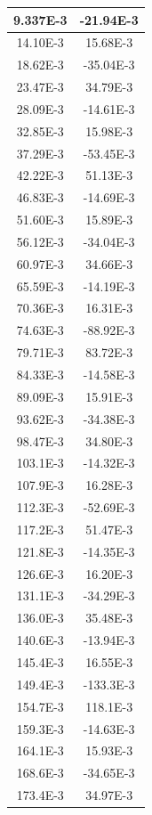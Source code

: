 \documentclass[english, 12pt, a4paper]{ifimaster}
\begin{document}
\begin{appendices}
\begin{center}
\begin{longtable}[htbp]{|c|c|}
\hline \hline
\endlastfoot
\hline
  9.337E-3 & -21.94E-3 \\
\hline
  14.10E-3 & 15.68E-3 \\
\hline
  18.62E-3 & -35.04E-3 \\
\hline
  23.47E-3 & 34.79E-3 \\
\hline
  28.09E-3 & -14.61E-3 \\
\hline
  32.85E-3 & 15.98E-3 \\
\hline
  37.29E-3 & -53.45E-3 \\
\hline
  42.22E-3 & 51.13E-3 \\
\hline
  46.83E-3 & -14.69E-3 \\
\hline
  51.60E-3 & 15.89E-3 \\
\hline
  56.12E-3 & -34.04E-3 \\
\hline
  60.97E-3 & 34.66E-3 \\
\hline
  65.59E-3 & -14.19E-3 \\
\hline
  70.36E-3 & 16.31E-3 \\
\hline
  74.63E-3 & -88.92E-3 \\
\hline
  79.71E-3 & 83.72E-3 \\
\hline
  84.33E-3 & -14.58E-3 \\
\hline
  89.09E-3 & 15.91E-3 \\
\hline
  93.62E-3 & -34.38E-3 \\
\hline
  98.47E-3 & 34.80E-3 \\
\hline
  103.1E-3 & -14.32E-3 \\
\hline
  107.9E-3 & 16.28E-3 \\
\hline
  112.3E-3 & -52.69E-3 \\
\hline
  117.2E-3 & 51.47E-3 \\
\hline
  121.8E-3 & -14.35E-3 \\
\hline
  126.6E-3 & 16.20E-3 \\
\hline
  131.1E-3 & -34.29E-3 \\
\hline
  136.0E-3 & 35.48E-3 \\
\hline
  140.6E-3 & -13.94E-3 \\
\hline
  145.4E-3 & 16.55E-3 \\
\hline
  149.4E-3 & -133.3E-3 \\
\hline
  154.7E-3 & 118.1E-3 \\
\hline
  159.3E-3 & -14.63E-3 \\
\hline
  164.1E-3 & 15.93E-3 \\
\hline
  168.6E-3 & -34.65E-3 \\
\hline
  173.4E-3 & 34.97E-3 \\

\end{longtable}
\end{center}
\end{appendices}
\end{document}
